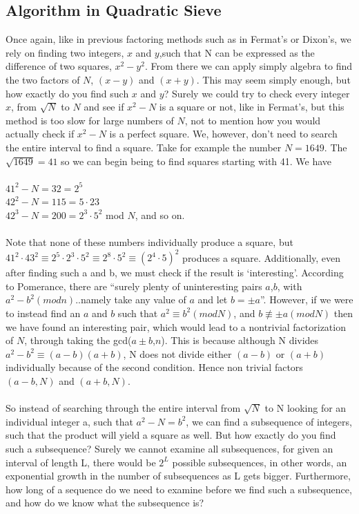 \documentclass[12pt]{article} %
\begin{document}
	\subsection {Algorithm in Quadratic Sieve}
	Once again, like in previous factoring methods such as in Fermat’s or Dixon’s, we rely on finding two integers, $x$ and $y$,such that N can be expressed as the difference of two squares, $x^{2}-y^{2}$. From there we can apply simply algebra to find the two factors of $N$, $(x-y)$ and $(x+y)$. This may seem simply enough, but how exactly do you find such $x$ and $y$? Surely we could try to check every integer $x$, from $\sqrt{N}$ to $N$ and see if $x^{2}-N$ is a square or not, like in Fermat’s, but this method is too slow for large numbers of $N$, not to mention how you would actually check if $x^{2}-N$ is a perfect square. We, however, don’t need to search the entire interval to find a square. Take for example the number $N = 1649$. The
	$\sqrt{1649} = 41$ so we can begin being to find squares starting with 41.  We have
	\\\\
	$41^{2} - N = 32 = 2^{5}$ \\ $42^{2} - N= 115 = 5\cdot 23$ \\ $42^{3} - N= 200 = 2^{3}\cdot 5^{2}$ mod $N$, and so on.
	\\\\Note that none of these numbers individually produce a square, but \\$41^{2}\cdot43^{2}\equiv 2^{5}\cdot2^{3}\cdot5^{2}\equiv 2^{8}\cdot5^{2}\equiv (2^{4}\cdot 5)^{2}$ produces a square. 
	Additionally, even after finding such a and b, we must check if the result is ‘interesting’. According to Pomerance, there are “surely plenty of uninteresting pairs $a$,$b$, with $a^{2}-b^{2}(mod  n)$..namely take any value of $a$ and let $b = \pm a$”. 
	However, if we were to instead find an $a$ and $b$ such that $a^{2}\equiv b^{2}(mod N)$, and $b \not\equiv \pm a(mod N)$ then we have found an interesting pair, which would lead to a nontrivial factorization of $N$, through taking the gcd($a\pm b$,$n$). This is because although N divides $a^{2}-b^{2}\equiv(a-b)(a+b)$, N does not divide either $(a-b)$ or $(a+b)$ individually because of the second condition. Hence non trivial factors $(a-b, N)$ and $(a+b, N)$. 
	\\\\
	So instead of searching through the entire interval from $\sqrt{N}$ to N looking for an individual integer a, such that $a^{2} - N = b^{2}$, we can find a subsequence of integers, such that the product will yield a square as well. But how exactly do you find such a subsequence? Surely we cannot examine all subsequences, for given an interval of length L, there would be $2^{L}$ possible subsequences, in other words, an exponential growth in the number of subsequences as L gets bigger. Furthermore, how long of a sequence do we need to examine before we find such a subsequence, and how do we know what the subsequence is? 
\end{document}
